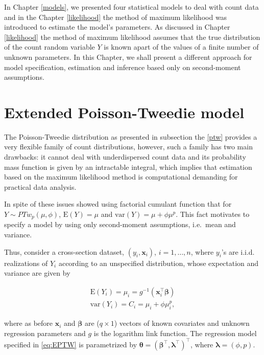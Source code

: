 \documentclass[9pt,a5paper,]{book}
\theoremstyle{definition}
\theoremstyle{definition}
\theoremstyle{remark}
\begin{document}
In Chapter \ref{models}, we presented four statistical models to deal
with count data and in the Chapter \ref{likelihood} the method of
maximum likelihood was introduced to estimate the model's parameters. As
discussed in Chapter \ref{likelihood} the method of maximum likelihood
assumes that the true distribution of the count random variable \(Y\) is
known apart of the values of a finite number of unknown parameters. In
this Chapter, we shall present a different approach for model
specification, estimation and inference based only on second-moment
assumptions.

\section{Extended Poisson-Tweedie
model}\label{extended-poisson-tweedie-model}

The Poisson-Tweedie distribution as presented in subsection the
\ref{ptw} provides a very flexible family of count distributions,
however, such a family has two main drawbacks: it cannot deal with
underdispersed count data and its probability mass function is given by
an intractable integral, which implies that estimation based on the
maximum likelihood method is computational demanding for practical data
analysis.

In spite of these issues \citet{Jorgensen2014} showed using factorial
cumulant function that for \(Y \sim PTw_p(\mu, \phi)\),
\(\mathrm{E}(Y) = \mu\) and \(\mathrm{var}(Y) = \mu + \phi \mu^p\). This
fact motivates \citet{Bonat2016b} to specify a model by using only
second-moment assumptions, i.e.~mean and variance.

Thus, consider a cross-section dataset, \((y_i, \boldsymbol{x}_i)\),
\(i = 1, \ldots, n\), where \(y_i\)'s are i.i.d. realizations of \(Y_i\)
according to an unspecified distribution, whose expectation and variance
are given by

\begin{align}
\mathrm{E}(Y_i) = \mu_i = g^{-1}(\boldsymbol{x}_i^{\top} \boldsymbol{\beta}) \nonumber \\
\mathrm{var}(Y_i) = C_i = \mu_i + \phi \mu_i^p,
\label{eq:EPTW}
\end{align}

where as before \(\boldsymbol{x}_i\) and \(\boldsymbol{\beta}\) are
(\(q \times 1\)) vectors of known covariates and unknown regression
parameters and \(g\) is the logarithm link function. The regression
model specified in \eqref{eq:EPTW} is parametrized by
\(\boldsymbol{\theta} = (\boldsymbol{\beta}^\top, \boldsymbol{\lambda}^\top )^\top\),
where \(\boldsymbol{\lambda} = (\phi, p)\).
\end{document}
